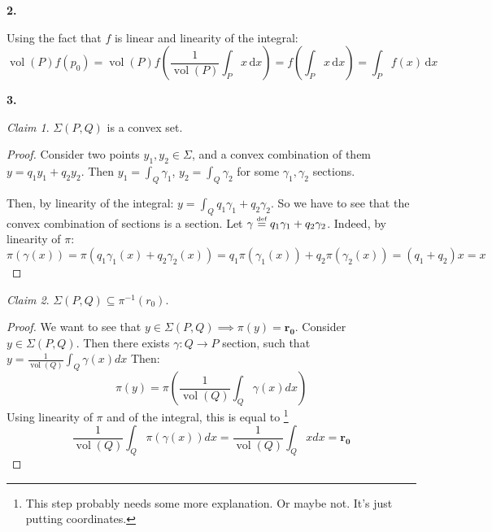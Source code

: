 \documentclass[10pt,a4paper]{article}
\DeclareMathOperator{\vol}{vol}
\def\defs{\stackrel{\tiny{\mbox{def}}}{=}}		%
\theoremstyle{plain}
\theoremstyle{remark}
\newtheorem{claim}{Claim}
\theoremstyle{definition}
\begin{document}
    \textbf{2.}
    
    Using the fact that $f$ is linear and linearity of the integral:
    \begin{equation}
    \vol(P) f(p_0)
    = \vol(P) f\left( \frac1{\vol (P)}\int_P x\,\mathrm{d}x \right)
    = f\left(\int_P x\,\mathrm{d}x \right) 
    = \int_P f(x) \,\mathrm{d}x
    \end{equation}
    
    \textbf{3. }
    
    
    \begin{claim}
        \label{clm:convex}
        $\Sigma(P,Q)$ is a convex set.
    \end{claim}
    \begin{proof}
        Consider two points $y_1,y_2 \in \Sigma$,
        and a convex combination of them $y= q_1y_1 + q_2y_2$. 
        Then $y_1 = \int_Q \gamma_1$, $y_2 = \int_Q \gamma_2$ 
        for some $\gamma_1,\gamma_2$ sections. 
        
        Then, by linearity of the integral:
        $y = \int_Q q_1\gamma_1 +q_2\gamma_2$. 
        So we have to see that the convex combination of sections is a section.
        Let $\gamma \defs q_1\gamma_1 +q_2\gamma_2$. 
        Indeed, by linearity of $\pi$:
        \begin{equation}
        \pi(\gamma(x)) = \pi(q_1\gamma_1(x) + q_2\gamma_2(x)) = q_1\pi(\gamma_1(x)) + q_2\pi(\gamma_2(x))
        = (q_1+q_2)x = x
        \end{equation}
    \end{proof}
    
    \begin{claim}
        $\Sigma(P,Q) \subseteq \pi^{-1}(r_0)$.
    \end{claim}
    \begin{proof}
        We want to see that $y\in\Sigma(P,Q) \implies \pi(y) = \bm{r_0}$.
        Consider $y\in \Sigma(P,Q)$. Then there exists $\gamma:Q\to P$ section,
        such that $y =\frac1{\vol(Q)} \int_Q \gamma(x)dx$
        Then:
        \begin{equation}
        \pi(y) = \pi\left(\frac{1}{\vol(Q)} \int_Q \gamma(x)dx\right)
        \end{equation}
        Using linearity of $\pi$ and of the integral, this is equal to
        \footnote{This step probably needs some more explanation. Or maybe not. It's just putting coordinates.}
        \begin{equation}
        \frac{1}{\vol(Q)}\int_Q \pi(\gamma(x))dx 
        = \frac{1}{\vol(Q)}\int_Q xdx 
        = \bm{r_0}
        \end{equation} 	
    \end{proof}
    
\end{document}
